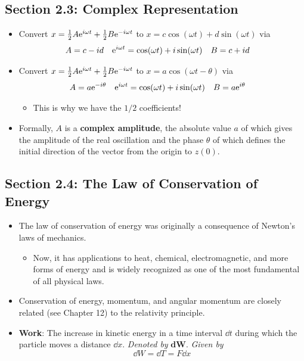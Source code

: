 \documentclass[../notes.tex]{subfiles}
\begin{document}
\subsection*{Section 2.3: Complex Representation}
\begin{itemize}
    \item Convert $x=\frac{1}{2}A\e[i\omega t]+\frac{1}{2}B\e[-i\omega t]$ to $x=c\cos(\omega t)+d\sin(\omega t)$ via
    \begin{align*}
        A &= c-id&
        \e[i\omega t] &= \cos(\omega t)+i\sin(\omega t)&
        B &= c+id
    \end{align*}
    \item Convert $x=\frac{1}{2}A\e[i\omega t]+\frac{1}{2}B\e[-i\omega t]$ to $x=a\cos(\omega t-\theta)$ via
    \begin{align*}
        A &= a\e[-i\theta]&
        \e[i\omega t] &= \cos(\omega t)+i\sin(\omega t)&
        B &= a\e[i\theta]
    \end{align*}
    \begin{itemize}
        \item This is why we have the $1/2$ coefficients!
    \end{itemize}
    \item Formally, $A$ is a \textbf{complex amplitude}, the absolute value $a$ of which gives the amplitude of the real oscillation and the phase $\theta$ of which defines the initial direction of the vector from the origin to $z(0)$.
\end{itemize}


\subsection*{Section 2.4: The Law of Conservation of Energy}
\begin{itemize}
    \item The law of conservation of energy was originally a consequence of Newton's laws of mechanics.
    \begin{itemize}
        \item Now, it has applications to heat, chemical, electromagnetic, and more forms of energy and is widely recognized as one of the most fundamental of all physical laws.
    \end{itemize}
    \item Conservation of energy, momentum, and angular momentum are closely related (see Chapter 12) to the relativity principle.
    \item \textbf{Work}: The increase in kinetic energy in a time interval $\dd{t}$ during which the particle moves a distance $\dd{x}$. \emph{Denoted by} $\bm{\textbf{d}{W}}$. \emph{Given by}
    \begin{equation*}
        \dd{W} = \dd{T} = F\dd{x}
    \end{equation*}
\end{itemize}
\end{document}
